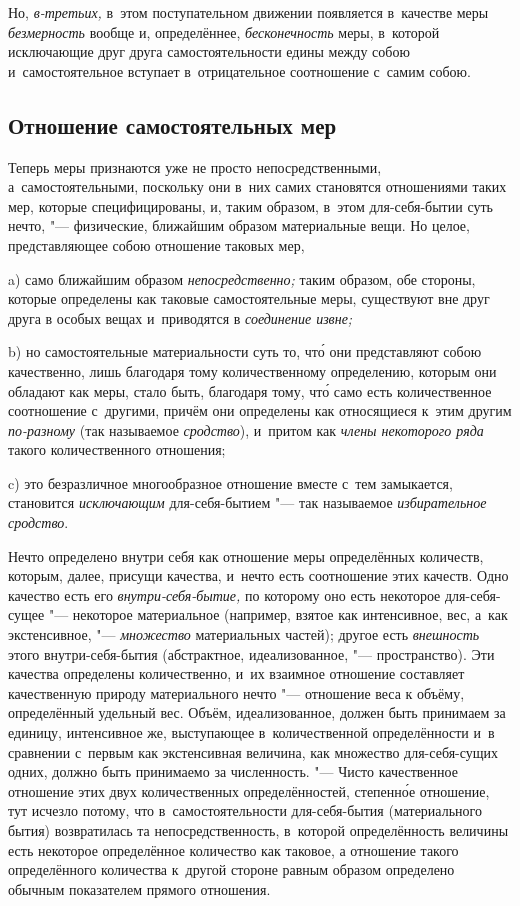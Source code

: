 Но, {\em в-третьих,} в~этом поступательном движении появляется в~качестве меры
{\em безмерность} вообще и, определённее, {\em бесконечность} меры, в~которой
исключающие друг друга самостоятельности едины между собою и~самостоятельное
вступает в~отрицательное соотношение с~самим собою.

\subsection{Отношение самостоятельных мер}

Теперь меры признаются уже не просто непосредственными, а~самостоятельными,
поскольку они в~них самих становятся отношениями таких мер, которые
специфицированы, и, таким образом, в~этом для-себя-бытии суть нечто, "---
физические, ближайшим образом материальные вещи. Но целое, представляющее
собою отношение таковых мер,

a) само ближайшим образом {\em непосредственно;} таким образом, обе стороны,
которые определены как таковые самостоятельные меры, существуют вне друг друга
в особых вещах и~приводятся в {\em соединение извне;}

b) но самостоятельные материальности суть то, чт\'{о} они представляют собою
качественно, лишь благодаря тому количественному определению, которым они
обладают как меры, стало быть, благодаря тому, чт\'{о} само есть количественное
соотношение с~другими, причём они определены как относящиеся к~этим другим
{\em по-разному} (так называемое {\em сродство}), и~притом как
{\em члены некоторого ряда} такого количественного отношения;

c) это безразличное многообразное отношение вместе с~тем замыкается,
становится {\em исключающим} для-себя-бытием "--- так называемое
{\em избирательное сродство}.


Нечто определено внутри себя как отношение меры определённых количеств,
которым, далее, присущи качества, и~нечто есть соотношение этих качеств. Одно
качество есть его {\em внутри-себя-бытие,} по которому оно есть некоторое
для-себя-сущее "--- некоторое материальное (например, взятое как интенсивное,
вес, а~как экстенсивное, "--- {\em множество} материальных частей); другое есть
{\em внешность} этого внутри-себя-бытия (абстрактное, идеализованное, "---
пространство). Эти качества определены количественно, и~их взаимное отношение
составляет качественную природу материального нечто "--- отношение веса к
объёму, определённый удельный вес. Объём, идеализованное, должен быть
принимаем за единицу, интенсивное же, выступающее в~количественной
определённости и~в сравнении с~первым как экстенсивная величина, как множество
для-себя-сущих одних, должно быть принимаемо за численность. "--- Чисто
качественное отношение этих двух количественных определённостей, степенн\'{о}е
отношение, тут исчезло потому, что в~самостоятельности для-себя-бытия
(материального бытия) возвратилась та непосредственность, в~которой
определённость величины есть некоторое определённое количество как таковое, а
отношение такого определённого количества к~другой стороне равным образом
определено обычным показателем прямого отношения.

